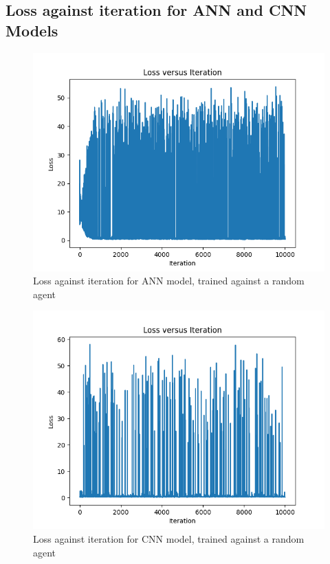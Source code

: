 \documentclass[a4paper,12pt,table]{article}
\begin{document}
\subsection{Loss against iteration for ANN and CNN Models}
\begin{figure}[h!]
    \begin{center}
        \includegraphics[scale=0.75]{Pure_ANN.png}
        \caption{Loss against iteration for ANN model, trained against a random agent}
        \label{fig:}
    \end{center}
\end{figure}

\begin{figure}[h!]
    \begin{center}
        \includegraphics[scale=0.75]{Pure_CNN.png}
        \caption{Loss against iteration for CNN model, trained against a random agent}
        \label{fig:}
    \end{center}
\end{figure}
\end{document}
